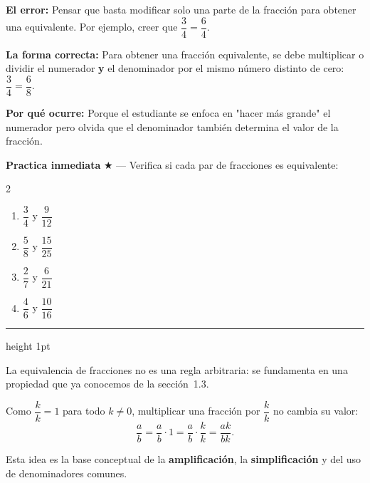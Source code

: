 \documentclass[11pt, letterpaper]{article}
\newcommand{\subbloque}[1]{%
  \vspace{14pt}
  \noindent{\large\bfseries\color{zenitnavy} #1}\par
  \vspace{4pt}\hrule height 1pt\vspace{8pt}}
\begin{document}
\begin{tcolorbox}[warningbox, title={Error frecuente --- Cambiar solo numerador o denominador}]
\noindent\textbf{El error:}
Pensar que basta modificar solo una parte de la fracci\'on para obtener una equivalente. Por ejemplo, creer que $\dfrac{3}{4}=\dfrac{6}{4}$.

\medskip
\noindent\textbf{La forma correcta:}
Para obtener una fracci\'on equivalente, se debe multiplicar o dividir el numerador \textbf{y} el denominador por el mismo n\'umero distinto de cero: $\dfrac{3}{4}=\dfrac{6}{8}$.

\medskip
\noindent\textbf{Por qu\'e ocurre:}
Porque el estudiante se enfoca en "hacer m\'as grande" el numerador pero olvida que el denominador tambi\'en determina el valor de la fracci\'on.
\end{tcolorbox}

\medskip
\textbf{Practica inmediata} \quad $\bigstar$ --- Verifica si cada par de fracciones es equivalente:
\begin{multicols}{2}
\begin{enumerate}[label=\alph*), leftmargin=*]
  \item $\dfrac{3}{4}$ y $\dfrac{9}{12}$
  \item $\dfrac{5}{8}$ y $\dfrac{15}{25}$
  \item $\dfrac{2}{7}$ y $\dfrac{6}{21}$
  \item $\dfrac{4}{6}$ y $\dfrac{10}{16}$
\end{enumerate}
\end{multicols}

\subbloque{2.3 Multiplicaci\'on por 1: $\dfrac{k}{k}$}
\label{sub:2.3}

La equivalencia de fracciones no es una regla arbitraria: se fundamenta en una propiedad que ya conocemos de la secci\'on~1.3.

\begin{tcolorbox}[importantbox, title={Regla estructural de equivalencia}]
Como $\dfrac{k}{k}=1$ para todo $k\neq 0$, multiplicar una fracci\'on por $\dfrac{k}{k}$ no cambia su valor:
$$\frac{a}{b}=\frac{a}{b}\cdot 1=\frac{a}{b}\cdot\frac{k}{k}=\frac{ak}{bk}.$$

Esta idea es la base conceptual de la \textbf{amplificaci\'on}, la \textbf{simplificaci\'on} y del uso de denominadores comunes.
\end{tcolorbox}
\end{document}
